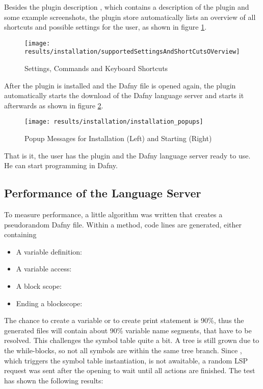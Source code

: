 Besides the plugin description \cite{our-dafny-plugin},
which contains a description of the plugin and some example screenshots,
the plugin store automatically lists an overview of all shortcuts and possible settings for the user,
as shown in figure \ref{fig:supportedSettingsAndShortCutsOVerview}.

\begin{figure}[H]
    \centering
    \texttt{[image: results/installation/supportedSettingsAndShortCutsOVerview]}
    \caption{Settings, Commands and Keyboard Shortcuts}
    \label{fig:supportedSettingsAndShortCutsOVerview}
\end{figure}

After the plugin is installed and the Dafny file is opened again,
the plugin automatically starts the download of the Dafny language server and
starts it afterwards as shown in figure \ref{fig:installation_popups}.

\begin{figure}[H]
    \centering
    \texttt{[image: results/installation/installation\_popups]}
    \caption{Popup Messages for Installation (Left) and Starting (Right)}
    \label{fig:installation_popups}
\end{figure}

That is it, the user has the plugin and the Dafny language server ready to use.
He can start programming in Dafny.

\subsection{Performance of the Language Server}
To measure performance, a little algorithm was written that creates a pseudorandom Dafny file.
Within a method, code lines are generated, either containing
\begin{itemize}
    \item A variable definition: 
    \item A variable access: 
    \item A block scope: 
    \item Ending a blockscope: \code{\}}
\end{itemize}
The chance to create a variable or to create print statement is 90\%, thus the generated files will contain about 90\% variable name segments, that have to be resolved.
This challenges the symbol table quite a bit.
A tree is still grown due to the while-blocks, so not all symbols are within the same tree branch.
Since , which triggers the symbol table instantiation, is not awaitable, a random LSP request was sent after the opening to wait until all actions are finished.
The test has shown the following results:

